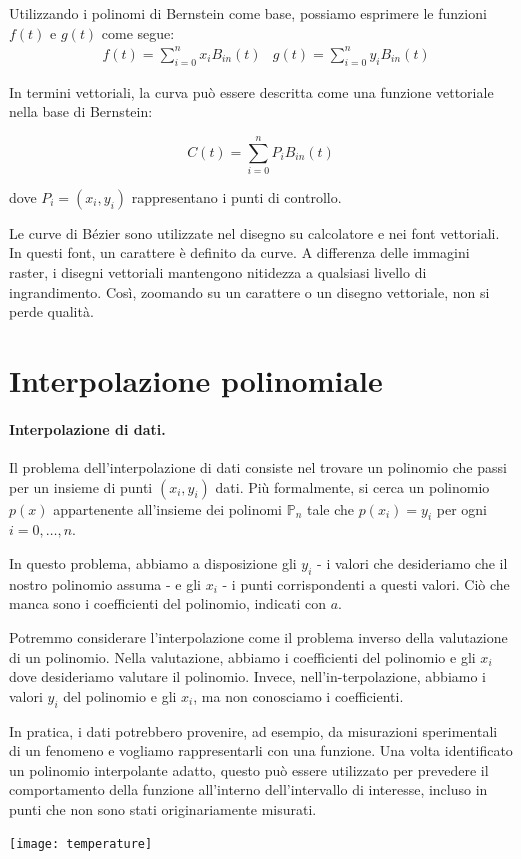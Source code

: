 \documentclass{article}
\begin{document}
Utilizzando i polinomi di Bernstein come base, possiamo esprimere le funzioni
\( f(t) \) e \( g(t) \) come segue:
\begin{equation*}
    \begin{aligned}
        &f(t)=\displaystyle\sum_{i=0}^{n}x_iB_{in}(t)
        &g(t)=\displaystyle\sum_{i=0}^{n} y_iB_{in}(t) 
    \end{aligned} 
\end{equation*}

In termini vettoriali, la curva può essere descritta come una funzione
vettoriale nella base di Bernstein:

$$C(t) = \sum_{i=0}^{n} P_i B_{in}(t)$$

dove \(P_i = (x_i, y_i)\) rappresentano i punti di controllo.

Le curve di Bézier sono utilizzate nel disegno su calcolatore e nei font
vettoriali. In questi font, un carattere è definito da curve. A differenza
delle immagini raster, i disegni vettoriali mantengono nitidezza a qualsiasi
livello di ingrandimento. Così, zoomando su un carattere o un disegno
vettoriale, non si perde qualità.
\newpage
\section{Interpolazione polinomiale}
\paragraph{Interpolazione di dati.} Il problema dell'interpolazione di dati
consiste nel trovare un polinomio che passi per un insieme di punti $(x_i,
y_i)$ dati. Più formalmente, si cerca un polinomio $p(x)$ appartenente
all'insieme dei polinomi $\mathbb{P}_n$ tale che $p(x_i)=y_i$ per ogni
$i=0,\ldots,n$.

In questo problema, abbiamo a disposizione gli $y_i$ - i valori che
desideriamo che il nostro polinomio assuma -  e gli $x_i$ - i punti
corrispondenti a questi valori. Ciò che manca sono i coefficienti del
polinomio, indicati con $a$.

Potremmo considerare l'interpolazione come il problema inverso della
valutazione di un polinomio. Nella valutazione, abbiamo i coefficienti del
polinomio e gli $x_i$ dove desideriamo valutare il polinomio. Invece,
nell'in-terpolazione, abbiamo i valori $y_i$ del polinomio e gli $x_i$, ma non
conosciamo i coefficienti.

In pratica, i dati potrebbero provenire, ad esempio, da misurazioni
sperimentali di un fenomeno e vogliamo rappresentarli con una funzione. Una
volta identificato un polinomio interpolante adatto, questo può essere
utilizzato per prevedere il comportamento della funzione all'interno
dell'intervallo di interesse, incluso in punti che non sono stati
originariamente misurati.
\begin{center}
    \texttt{[image: temperature]}
\end{center}
\end{document}
